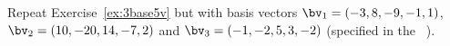 \begin{exercise} \label{ex:} 
Repeat Exercise~\ref{ex:3base5v} but with basis vectors \(\bv_1=(-3,8,-9,-1,1)\), \(\bv_2=(10,-20,14,-7,2)\) and \(\bv_3=(-1,-2,5,3,-2)\) (specified in the ~\cE).
\setbox\ajrqrbox\hbox{}\marginpar{\usebox{\ajrqrbox}}
\end{exercise}




\begin{comment}%
why, what caused X?
how did X occur?
what-if? what-if-not?
how does X compare with Y?
what is the evidence for X?
why is X important?
\end{comment}






